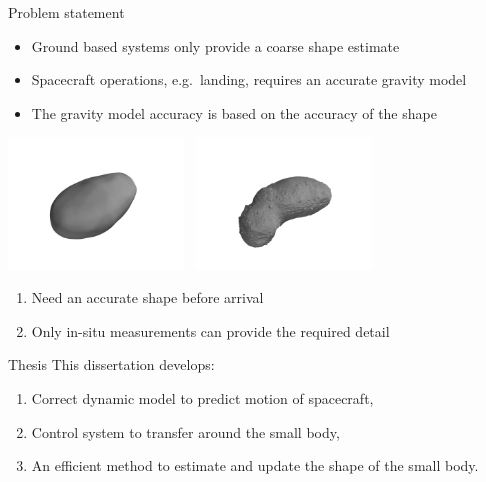 \begin{frame}[t]{Problem statement}
    \begin{itemize}
        \item Ground based systems only provide a coarse shape estimate
        \item Spacecraft operations, e.g.\ landing, requires an accurate gravity model
        \item The gravity model accuracy is based on the accuracy of the shape
    \end{itemize}
    \pause
    \begin{center}
    \includegraphics[trim={25cm 15cm 25cm 15cm},clip,width=0.35\textwidth,height=0.5\textheight,keepaspectratio]{figures/mathematical_background/itokawa_radar_isometric.jpg}~
    \includegraphics[trim={25cm 12cm 25cm 15cm},clip,width=0.35\textwidth,height=0.5\textheight,keepaspectratio]{figures/mathematical_background/itokawa_isometric.jpg}
    \end{center}
    \begin{block}{}
        \begin{center}
            \begin{enumerate}
                \item Need an accurate shape before arrival
                \item Only in-situ measurements can provide the required detail
            \end{enumerate}
        \end{center}
    \end{block}
    
\end{frame}

\begin{frame}{Thesis}
    This dissertation develops:
    \pause
    \begin{enumerate}
        \item Correct dynamic model to predict motion of spacecraft,
            \pause
        \item Control system to transfer around the small body,
            \pause
        \item An efficient method to estimate and update the shape of the small body.
    \end{enumerate}
\end{frame}



